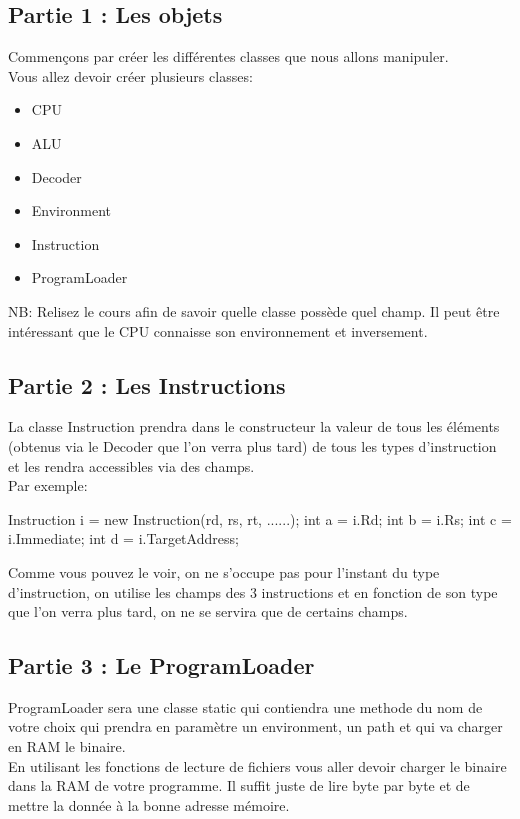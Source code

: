 \subsection{Partie 1 : Les objets}
Commençons par créer les différentes classes
que nous allons manipuler.\\ Vous allez devoir créer plusieurs classes:
\begin{itemize}
  \item CPU
  \item ALU
  \item Decoder
  \item Environment
  \item Instruction
  \item ProgramLoader 
\end{itemize} 
NB: Relisez le cours afin de
        savoir quelle classe possède quel champ. Il peut être intéressant que le
        CPU connaisse son environnement et inversement.

\subsection{Partie 2 : Les Instructions}
La classe Instruction prendra dans le
constructeur la valeur de tous les éléments (obtenus via le Decoder que l'on
verra plus tard) de tous les types d'instruction et les rendra accessibles via
des champs.\\ Par exemple: 
\begin{code} 
  Instruction i = new Instruction(rd, rs, rt, ......); 
  int a = i.Rd;
  int b = i.Rs;
  int c = i.Immediate;
  int d = i.TargetAddress;
\end{code}
Comme vous pouvez le voir, on ne s'occupe pas pour
l'instant du type d'instruction, on utilise les champs des 3 instructions et en
fonction de son type que l'on verra plus tard, on ne se servira que de certains
champs.

\subsection{Partie 3 : Le ProgramLoader}
ProgramLoader sera une classe static
qui contiendra une methode du nom de votre choix qui prendra en paramètre un
environment, un path et qui va charger en RAM le binaire.\\

En utilisant les fonctions de lecture de fichiers vous aller devoir charger le
binaire dans la RAM de votre programme. Il suffit juste de lire byte par byte et
de mettre la donnée à la bonne adresse mémoire.

